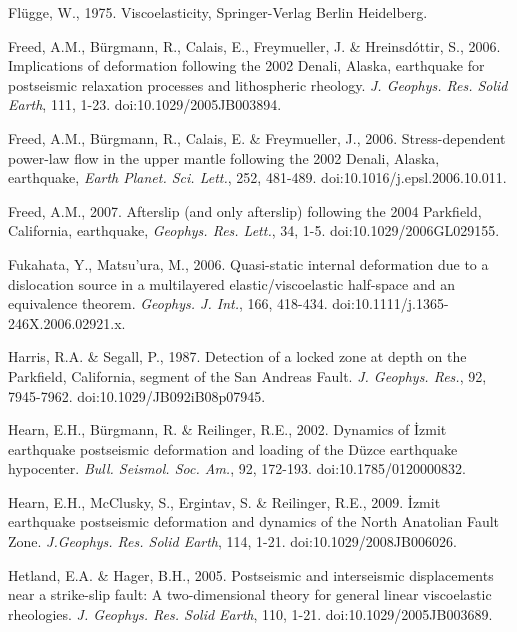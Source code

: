 \documentclass[extra,mreferee]{gji}
\begin{document}
\begin{thebibliography}{}
 Fl\"ugge,
  W., 1975. Viscoelasticity, Springer-Verlag Berlin Heidelberg.

 Freed, A.M., B\"urgmann,
  R., Calais, E., Freymueller, J. \& Hreinsd\'ottir, S.,
  2006. Implications of deformation following the 2002 Denali, Alaska,
  earthquake for postseismic relaxation processes and lithospheric
  rheology. \textit{J. Geophys. Res. Solid Earth}, 111,
  1-23. doi:10.1029/2005JB003894.

 Freed, A.M.,
  B\"urgmann, R., Calais, E. \& Freymueller, J.,
  2006. Stress-dependent power-law flow in the upper mantle following
  the 2002 Denali, Alaska, earthquake, \textit{Earth
    Planet. Sci. Lett.}, 252, 481-489. doi:10.1016/j.epsl.2006.10.011.

 Freed, A.M., 2007. Afterslip
  (and only afterslip) following the 2004 Parkfield, California,
  earthquake, \textit{Geophys. Res. Lett.}, 34,
  1-5. doi:10.1029/2006GL029155.

 Fukahata, Y.,
  Matsu’ura, M., 2006. Quasi-static internal deformation due to a
  dislocation source in a multilayered elastic/viscoelastic half-space
  and an equivalence theorem. \textit{Geophys. J. Int.}, 166,
  418-434. doi:10.1111/j.1365-246X.2006.02921.x.

 Harris, R.A. \&
  Segall, P., 1987. Detection of a locked zone at depth on the
  Parkfield, California, segment of the San Andreas
  Fault. \textit{J. Geophys. Res.}, 92,
  7945-7962. doi:10.1029/JB092iB08p07945.

 Hearn, E.H., B\"urgmann, R. \&
  Reilinger, R.E., 2002. Dynamics of \.Izmit earthquake postseismic
  deformation and loading of the D\"uzce earthquake
  hypocenter. \textit{Bull.  Seismol. Soc. Am.}, 92,
  172-193. doi:10.1785/0120000832.

 Hearn, E.H., McClusky, S.,
  Ergintav, S. \& Reilinger, R.E., 2009. \.Izmit earthquake
  postseismic deformation and dynamics of the North Anatolian Fault
  Zone. \textit{J.Geophys. Res. Solid Earth}, 114,
  1-21. doi:10.1029/2008JB006026.

 Hetland, E.A. \& Hager,
  B.H., 2005. Postseismic and interseismic displacements near a
  strike-slip fault: A two-dimensional theory for general linear
  viscoelastic rheologies. \textit{J. Geophys. Res. Solid Earth}, 110,
  1-21. doi:10.1029/2005JB003689.


\end{thebibliography}
\end{document}
